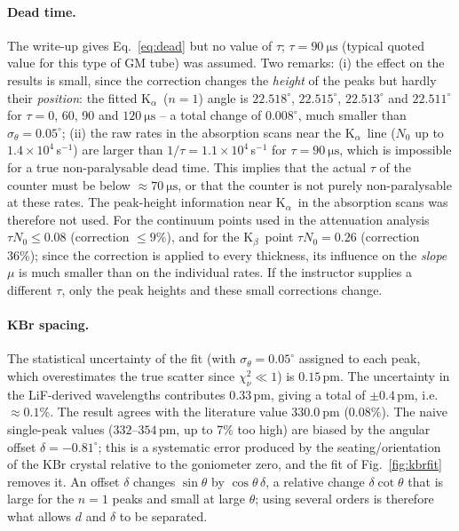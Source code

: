 \documentclass[11pt,a4paper]{article}
\newcommand{\Ka}{K$_\alpha$}
\newcommand{\Kb}{K$_\beta$}
\begin{document}
\paragraph{Dead time.} The write-up gives Eq.~\eqref{eq:dead} but no value of $\tau$; $\tau=\SI{90}{\micro\second}$ (typical quoted value for this type of GM tube) was assumed. Two remarks: (i) the effect on the results is small, since the correction changes the \emph{height} of the peaks but hardly their \emph{position}: the fitted \Ka\ ($n=1$) angle is $22.518^\circ$, $22.515^\circ$, $22.513^\circ$ and $22.511^\circ$ for $\tau=0$, 60, 90 and $\SI{120}{\micro\second}$ -- a total change of $0.008^\circ$, much smaller than $\sigma_\theta=0.05^\circ$; (ii) the raw rates in the absorption scans near the \Ka\ line ($N_0$ up to $1.4\times10^4$\,s$^{-1}$) are larger than $1/\tau=1.1\times10^4$\,s$^{-1}$ for $\tau=\SI{90}{\micro\second}$, which is impossible for a true non-paralysable dead time. This implies that the actual $\tau$ of the counter must be below $\approx\SI{70}{\micro\second}$, or that the counter is not purely non-paralysable at these rates. The peak-height information near \Ka\ in the absorption scans was therefore not used. For the continuum points used in the attenuation analysis $\tau N_0\le0.08$ (correction $\le9$\%), and for the \Kb\ point $\tau N_0=0.26$ (correction 36\%); since the correction is applied to every thickness, its influence on the \emph{slope} $\mu$ is much smaller than on the individual rates. If the instructor supplies a different $\tau$, only the peak heights and these small corrections change.

\paragraph{KBr spacing.} The statistical uncertainty of the fit (with $\sigma_\theta=0.05^\circ$ assigned to each peak, which overestimates the true scatter since $\chi^2_\nu\ll1$) is $0.15$\,pm. The uncertainty in the LiF-derived wavelengths contributes $0.33$\,pm, giving a total of $\pm0.4$\,pm, i.e.\ $\approx0.1$\%. The result agrees with the literature value $\SI{330.0}{\pico\metre}$ ($0.08\%$). The naive single-peak values ($332$--$354$\,pm, up to 7\% too high) are biased by the angular offset $\delta=-0.81^\circ$; this is a systematic error produced by the seating/orientation of the KBr crystal relative to the goniometer zero, and the fit of Fig.~\ref{fig:kbrfit} removes it. An offset $\delta$ changes $\sin\theta$ by $\cos\theta\,\delta$, a relative change $\delta\cot\theta$ that is large for the $n=1$ peaks and small at large $\theta$; using several orders is therefore what allows $d$ and $\delta$ to be separated.
\end{document}
